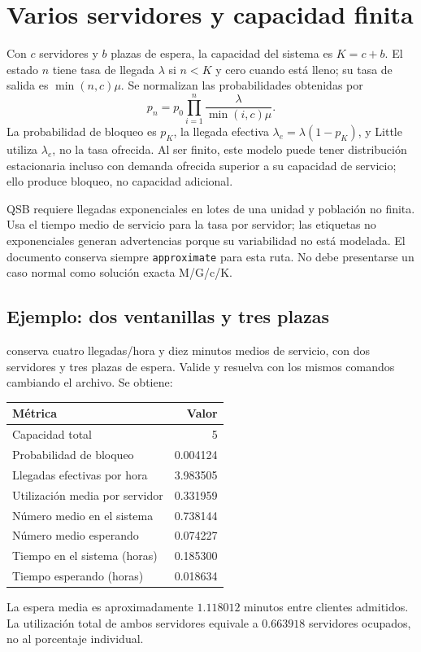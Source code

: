 \section{Varios servidores y capacidad finita}
Con \(c\) servidores y \(b\) plazas de espera, la capacidad del sistema es
\(K=c+b\). El estado \(n\) tiene tasa de llegada \(\lambda\) si \(n<K\)
y cero cuando está lleno; su tasa de salida es \(\min(n,c)\mu\).
Se normalizan las probabilidades obtenidas por
\[
 p_n=p_0\prod_{i=1}^n\frac{\lambda}{\min(i,c)\mu}.
\]
La probabilidad de bloqueo es \(p_K\), la llegada efectiva
\(\lambda_e=\lambda(1-p_K)\), y Little utiliza \(\lambda_e\), no la tasa
ofrecida. Al ser finito, este modelo puede tener distribución estacionaria
incluso con demanda ofrecida superior a su capacidad de servicio; ello produce
bloqueo, no capacidad adicional.

QSB requiere llegadas exponenciales en lotes de una unidad y población no
finita. Usa el tiempo medio de servicio para la tasa por servidor; las
etiquetas no exponenciales generan advertencias porque su variabilidad no está
modelada. El documento conserva siempre \texttt{approximate} para esta ruta.
No debe presentarse un caso normal como solución exacta M/G/c/K.

\subsection{Ejemplo: dos ventanillas y tres plazas}
 conserva cuatro llegadas/hora y diez minutos
medios de servicio, con dos servidores y tres plazas de espera. Valide y
resuelva con los mismos comandos cambiando el archivo. Se obtiene:
\begin{center}
\begin{tabular}{lr}
\toprule
Métrica & Valor \\
\midrule
Capacidad total & 5 \\
Probabilidad de bloqueo & 0.004124 \\
Llegadas efectivas por hora & 3.983505 \\
Utilización media por servidor & 0.331959 \\
Número medio en el sistema & 0.738144 \\
Número medio esperando & 0.074227 \\
Tiempo en el sistema (horas) & 0.185300 \\
Tiempo esperando (horas) & 0.018634 \\
\bottomrule
\end{tabular}
\end{center}
La espera media es aproximadamente \(1.118012\) minutos entre clientes
admitidos. La utilización total de ambos servidores equivale a
\(0.663918\) servidores ocupados, no al porcentaje individual.

